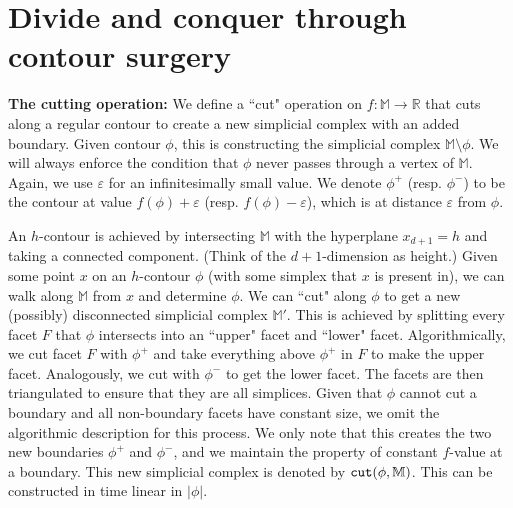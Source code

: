 \documentclass[11pt]{article}
\theoremstyle{definition}
\newcommand{\MM}{\mathbb{M}}
\newcommand{\RR}{\mathbb{R}}
\newcommand{\eps}{\varepsilon}
\newcommand{\cut}{{\tt cut}}
\begin{document}
\section{Divide and conquer through contour surgery} \label{sec:surgery}

{\bf The cutting operation:} We define a ``cut" operation on $f:\MM \rightarrow \RR$ that cuts along a regular contour to create
a new simplicial complex with an added boundary. Given contour $\phi$, this is constructing the simplicial complex $\MM \setminus \phi$. 
We will always enforce the condition that $\phi$ never passes through a vertex of $\MM$.
Again, we use $\eps$ for an infinitesimally small value. We denote $\phi^+$ (resp. $\phi^-$) to be
the contour at value $f(\phi) + \eps$ (resp. $f(\phi) - \eps$), which is at distance $\eps$
from $\phi$. 

An $h$-contour is achieved by intersecting $\MM$ with the hyperplane $x_{d+1} = h$ and taking a connected component. (Think of the $d+1$-dimension
as height.) Given some point $x$
on an $h$-contour $\phi$ (with some simplex that $x$ is present in), we can walk along $\MM$ from $x$ and determine $\phi$.
We can ``cut" along $\phi$ to get a new (possibly) disconnected simplicial complex $\MM'$. This is achieved
by splitting every facet $F$ that $\phi$ intersects into an ``upper" facet and ``lower" facet. Algorithmically,
we cut facet $F$ with $\phi^+$ and take everything above $\phi^+$ in $F$ to make the upper facet. Analogously, we cut with $\phi^-$ to get the lower facet.
The facets are then triangulated to ensure that they are all simplices.
Given that $\phi$ cannot cut a boundary and all non-boundary facets
have constant size, we omit the algorithmic description for this process. We only note that this
creates the two new boundaries $\phi^+$ and $\phi^-$, and we maintain the property of constant $f$-value at a boundary.
This new simplicial complex is denoted by $\cut(\phi,\MM)$.
This can be constructed in time linear in $|\phi|$.

\end{document}
